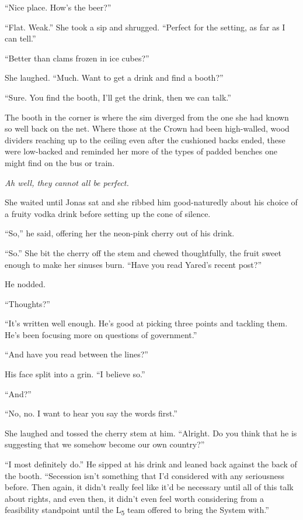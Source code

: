 ``Nice place. How's the beer?''

``Flat. Weak.'' She took a sip and shrugged. ``Perfect for the setting, as far as I can tell.''

``Better than clams frozen in ice cubes?''

She laughed. ``Much. Want to get a drink and find a booth?''

``Sure. You find the booth, I'll get the drink, then we can talk.''

The booth in the corner is where the sim diverged from the one she had known so well back on the net. Where those at the Crown had been high-walled, wood dividers reaching up to the ceiling even after the cushioned backs ended, these were low-backed and reminded her more of the types of padded benches one might find on the bus or train.

\emph{Ah well, they cannot all be perfect.}

She waited until Jonas sat and she ribbed him good-naturedly about his choice of a fruity vodka drink before setting up the cone of silence.

``So,'' he said, offering her the neon-pink cherry out of his drink.

``So.'' She bit the cherry off the stem and chewed thoughtfully, the fruit sweet enough to make her sinuses burn. ``Have you read Yared's recent post?''

He nodded.

``Thoughts?''

``It's written well enough. He's good at picking three points and tackling them. He's been focusing more on questions of government.''

``And have you read between the lines?''

His face split into a grin. ``I believe so.''

``And?''

``No, no. I want to hear you say the words first.''

She laughed and tossed the cherry stem at him. ``Alright. Do you think that he is suggesting that we somehow become our own country?''

``I most definitely do.'' He sipped at his drink and leaned back against the back of the booth. ``Secession isn't something that I'd considered with any seriousness before. Then again, it didn't really feel like it'd be necessary until all of this talk about rights, and even then, it didn't even feel worth considering from a feasibility standpoint until the L\textsubscript{5} team offered to bring the System with.''

